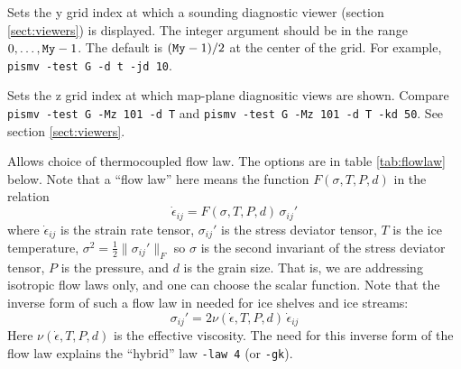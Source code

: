 \documentclass[12pt,final]{amsart}
\renewcommand{\t}[1]{\texttt{#1}}
\newcommand{\eps}{\epsilon}
\begin{document}
  Sets the y grid index at which a sounding diagnostic viewer (section \ref{sect:viewers}) is displayed.  The integer argument should be in the range $0,\dots,\text{\t{My}}-1$.  The default is $(\text{\t{My}}-1)/2$ at the center of the grid.  For example, \verb|pismv -test G -d t -jd 10|.

  Sets the z grid index at which map-plane diagnositic views are shown.  Compare \verb|pismv -test G -Mz 101 -d T| and \verb|pismv -test G -Mz 101 -d T -kd 50|.  See section \ref{sect:viewers}.

  Allows choice of thermocoupled flow law.  The options are in table \ref{tab:flowlaw} below.  Note that a ``flow law'' here means the function $F(\sigma,T,P,d)$ in the relation
	$$\dot \eps_{ij} = F(\sigma,T,P,d)\, \sigma_{ij}'$$
where $\dot \eps_{ij}$ is the strain rate tensor, $\sigma_{ij}'$ is the stress deviator tensor, $T$ is the ice temperature, $\sigma^2 = \frac{1}{2} \|\sigma_{ij}'\|_F$ so $\sigma$ is the second invariant of the stress deviator tensor, $P$ is the pressure, and $d$ is the grain size.  That is, we are addressing isotropic flow laws only, and one can choose the scalar function.  Note that the inverse form of such a flow law in needed for ice shelves and ice streams:
	$$\sigma_{ij}' = 2 \nu(\dot\eps,T,P,d)\,\dot \eps_{ij} $$
Here $\nu(\dot \eps,T,P,d)$ is the effective viscosity.  The need for this inverse form of the flow law explains the ``hybrid'' law \verb|-law 4| (or \verb|-gk|).
\end{document}

